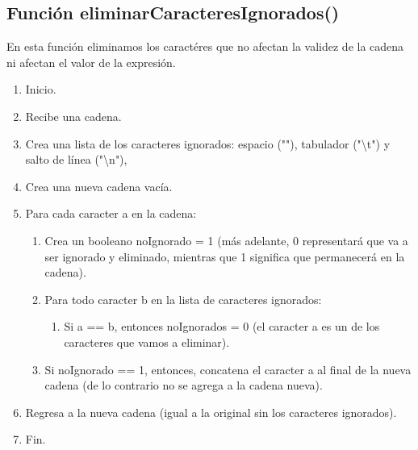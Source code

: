 \documentclass{article}
\begin{document}
\subsection{Función eliminarCaracteresIgnorados()}
\normalsize En esta función eliminamos los caractéres que no afectan la validez de la cadena ni afectan el valor de la expresión.
\begin{enumerate}
    \item Inicio.
    \item Recibe una cadena.
    \item Crea una lista de los caracteres ignorados: espacio (""), tabulador ("\backslash t") y salto de línea ("\backslash n"),
    \item Crea una nueva cadena vacía.
    \item Para cada caracter a  en la cadena:
    \begin{enumerate}
        \item Crea un booleano noIgnorado  = 1  (más adelante, 0 representará que va a ser ignorado y eliminado, mientras que 1 significa que permanecerá en la cadena).
        \item Para todo caracter b  en la lista de caracteres ignorados:
        \begin{enumerate}
            \item Si a == b, entonces noIgnorados = 0 (el caracter a es un de los caracteres que vamos a eliminar).
        \end{enumerate}
        \item Si noIgnorado == 1, entonces, concatena el caracter a al final de la nueva cadena (de lo contrario no se agrega a la cadena nueva).
    \end{enumerate}
    \item Regresa a la nueva cadena (igual a la original sin los caracteres ignorados).
    \item Fin.
\end{enumerate}
\end{document}
